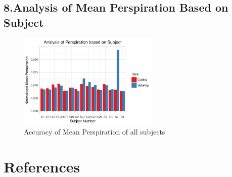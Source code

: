 \documentclass[12pt,epsf]{report}
\begin{document}
\subsection*{8.Analysis of Mean Perspiration Based on Subject}
\begin{figure}[!htb]
	\centering
	\includegraphics[width=0.6\textwidth]{SubjectVsPP.pdf}
	\caption{Accuracy of Mean Perspiration of all subjects}
	\centering
\end{figure}
\newpage
\section*{References}
\end{document}
